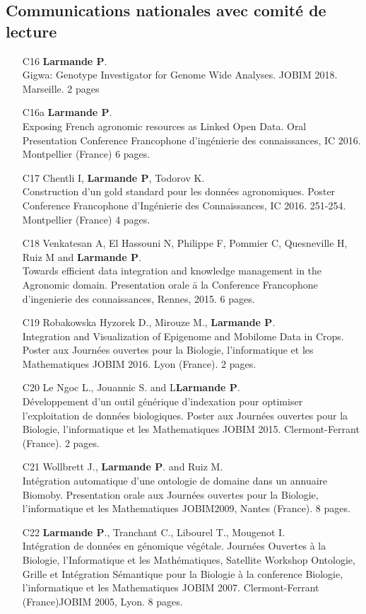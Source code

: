 \subsection*{Communications nationales avec comité de lecture }
\begin{itemize} 
\item [C16]	 \textbf{Larmande P}.\\ Gigwa: Genotype Investigator for Genome Wide Analyses. JOBIM 2018. Marseille. 2 pages
\item [C16a]	\textbf{Larmande P}.\\ Exposing French agronomic resources as Linked Open Data. Oral Presentation Conference Francophone d’ingénierie des connaissances, IC 2016. Montpellier (France) 6 pages.
\item [C17]	Chentli I, \textbf{Larmande P}, Todorov K.\\ Construction d’un gold standard pour les données agronomiques. Poster Conference Francophone d’Ingénierie des Connaissances, IC 2016. 251-254. Montpellier (France) 4 pages.
\item [C18]	Venkatesan A, El Hassouni N, Philippe F, Pommier C, Quesneville H, Ruiz M and \textbf{Larmande P}.\\ Towards efficient data integration and knowledge management in the Agronomic domain. Presentation orale ā la Conference Francophone d’ingenierie des connaissances, Rennes, 2015. 6 pages.
\item [C19]	Robakowska Hyzorek D., Mirouze M., \textbf{Larmande P}.\\ Integration and Visualization of Epigenome and Mobilome Data in Crops. Poster aux Journées ouvertes pour la Biologie, l’informatique et les Mathematiques JOBIM 2016. Lyon (France). 2 pages.
\item [C20]	Le Ngoc L., Jouannic S. and L\textbf{Larmande P}.\\ Développement d'un outil générique d'indexation pour optimiser l'exploitation de données biologiques. Poster aux Journées ouvertes pour la Biologie, l’informatique et les Mathematiques JOBIM 2015. Clermont-Ferrant (France). 2 pages.
\item [C21]	Wollbrett J., \textbf{Larmande P}. and Ruiz M.\\ Intégration automatique d’une ontologie de domaine dans un annuaire Biomoby. Presentation orale aux Journées ouvertes pour la Biologie, l’informatique et les Mathematiques JOBIM2009, Nantes (France). 8 pages.
\item [C22]	\textbf{Larmande P}., Tranchant C., Libourel T., Mougenot I.\\ Intégration de données en génomique végétale. Journées Ouvertes à la Biologie, l’Informatique et les Mathématiques, Satellite Workshop Ontologie, Grille et Intégration Sémantique pour la Biologie à la conference Biologie, l’informatique et les Mathematiques JOBIM 2007. Clermont-Ferrant (France)JOBIM 2005, Lyon. 8 pages.
\end{itemize} 




